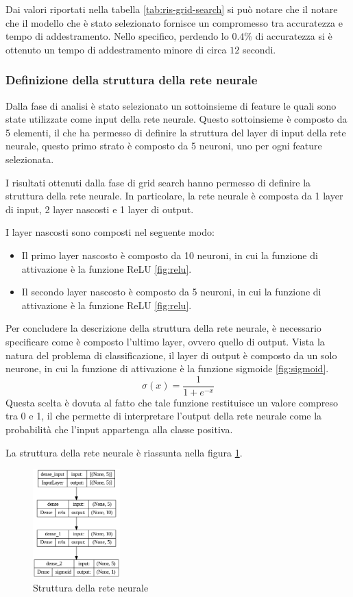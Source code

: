 Dai valori riportati nella tabella \ref{tab:ris-grid-search} si può notare che il
notare che il modello che è stato selezionato fornisce un compromesso tra
accuratezza e tempo di addestramento. Nello specifico, perdendo lo $0.4\%$ di
accuratezza si è ottenuto un tempo di addestramento minore di circa $12$ secondi.
\subsubsection{Definizione della struttura della rete neurale}
Dalla fase di analisi è stato selezionato un sottoinsieme di feature le quali
sono state utilizzate come input della rete neurale. Questo sottoinsieme è
composto da 5 elementi, il che ha permesso di definire la struttura del layer di
input della rete neurale, questo primo strato è composto da 5 neuroni, uno per
ogni feature selezionata.

I risultati ottenuti dalla fase di grid search hanno permesso di definire la
struttura della rete neurale. In particolare, la rete neurale è composta da 1
layer di input, 2 layer nascosti e 1 layer di output.

I layer nascosti sono composti nel seguente modo:
\begin{itemize}
    \item Il primo layer nascosto è composto da 10 neuroni, in cui la funzione di
          attivazione è la funzione ReLU \ref{fig:relu}.
    \item Il secondo layer nascosto è composto da 5 neuroni, in cui la funzione
          di attivazione è la funzione ReLU \ref{fig:relu}.
\end{itemize}

Per concludere la descrizione della struttura della rete neurale, è necessario
specificare come è composto l'ultimo layer, ovvero quello di output. Vista la
natura del problema di classificazione, il layer di output è composto da un solo
neurone, in cui la funzione di attivazione è la funzione sigmoide \ref{fig:sigmoid}.
\begin{equation}
    \sigma(x) = \frac{1}{1 + e^{-x}}
\end{equation}
Questa scelta è dovuta al fatto che tale funzione restituisce un valore compreso
tra 0 e 1, il che permette di interpretare l'output della rete neurale come la
probabilità che l'input appartenga alla classe positiva.

La struttura della rete neurale è riassunta nella figura \ref{fig:strutturaReteNeurale}.
\begin{figure}[!ht]
    \centering
    \includegraphics[width=0.3\textwidth]{img/rete/struttura_rete.png}
    \caption{Struttura della rete neurale}
    \label{fig:strutturaReteNeurale}
\end{figure}
